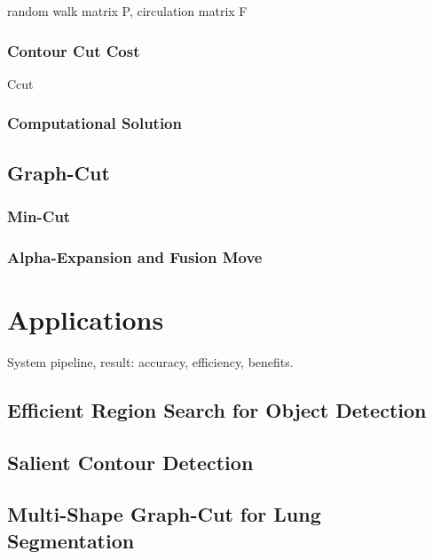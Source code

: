 \documentclass{SMBV12}
\begin{document}
random walk matrix P, circulation matrix F

\subsubsection{Contour Cut Cost}

Ccut

\cite{zhu2007untangling}
\cite{KenGalShi2011}

\subsubsection{Computational Solution}

\subsection{Graph-Cut}
\label{sec:graph_cut}
\subsubsection{Min-Cut}

\subsubsection{Alpha-Expansion and Fusion Move}

\section{Applications}

System pipeline, result: accuracy, efficiency, benefits.

\subsection{Efficient Region Search for Object Detection}

\cite{VijayGrauman2011}

\subsection{Salient Contour Detection}

\cite{KenGalShi2011}

\subsection{Multi-Shape Graph-Cut for Lung Segmentation}

\cite{nakagomimulti}
\end{document}
